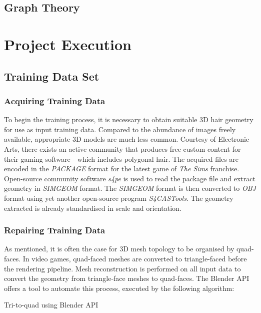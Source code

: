 \documentclass[ %
                    author={Dillon Keith Diep [INCOMPLETE DRAFT, NOT FOR SUBMISSION]},
                supervisor={Dr. Carl Henrik Ek},
                    degree={MEng},
                     title={ARt-CG:},
                  subtitle={Assisted Real-time Content Generation of 3D Hair by Learning Manifolds},
                      type={Research},
                      year={2014} ]{dissertation}
\begin{document}
\section{Graph Theory}




\chapter{Project Execution}
\label{chap:execution}

\section{Training Data Set}
\subsection{Acquiring Training Data}
To begin the training process, it is necessary to obtain suitable 3D hair geometry for use as input training data. Compared to the abundance of images freely available, appropriate 3D models are much less common. Courtesy of Electronic Arts, there exists an active community that produces free custom content for their gaming software - which includes polygonal hair. \cite{tsr} The acquired files are encoded in the \textit{PACKAGE} format for the latest game of \textit{The Sims} franchise. Open-source community software \textit{s4pe} is used to read the package file and extract geometry in \textit{SIMGEOM} format. \cite{s4pe} The \textit{SIMGEOM} format is then converted to \textit{OBJ} format using yet another open-source program \textit{S4CASTools}. \cite{s4cas} The geometry extracted is already standardised in scale and orientation.

\subsection{Repairing Training Data}
As mentioned, it is often the case for 3D mesh topology to be organised by quad-faces. In video games, quad-faced meshes are converted to triangle-faced before the rendering pipeline. Mesh reconstruction is performed on all input data to convert the geometry from triangle-face meshes to quad-faces. The Blender API offers a tool to automate this process, executed by the following algorithm:

\begin{algorithm}[!h]
	\caption{Tri-to-quad using Blender API}
\end{algorithm}
\end{document}
